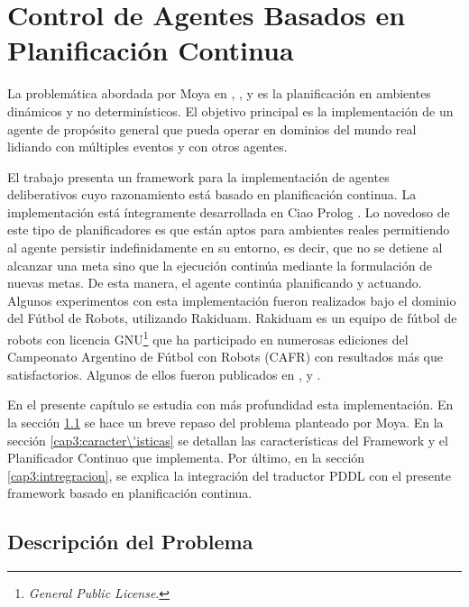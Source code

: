 
\chapter{Control de Agentes Basados en Planificaci\'on Continua} \label{pagcap3}

La problem\'atica abordada por Moya en \cite{gbraun:tesisMarioMoya}, \cite{moya08:_planif_contin_como_contr_de_agent_robot},
\cite{moya08:_un_planif_contin_concur_para_agent_robot} y \cite{moya09:_agent_delib_basad_en_contin}
es la planificaci\'on en ambientes din\'amicos y no determin\'isticos. 
El objetivo principal es la implementaci\'on de un agente de prop\'osito general
que pueda operar en dominios del mundo real lidiando con m\'ultiples
eventos y con otros agentes.

El trabajo presenta un framework para la implementaci\'on de 
agentes deliberativos cuyo ra\-zo\-na\-mien\-to est\'a basado en planificaci\'on
continua. La implementaci\'on est\'a \'integramente desarrollada en
Ciao Prolog \cite{ciao-reference-manual-tr}.
Lo novedoso de este tipo de planificadores es que est\'an aptos para ambientes
reales permitiendo al agente persistir indefinidamente
en su entorno, es decir, que no se detiene al alcanzar una meta
sino que la ejecuci\'on contin\'ua mediante la formulaci\'on de nuevas
metas. De esta manera, el agente contin\'ua planificando y actuando. 
Algunos experimentos con esta implementaci\'on fueron realizados bajo el
dominio del F\'utbol de Robots,
utilizando Rakiduam. Rakiduam es un equipo de f\'utbol de robots
con licencia GNU\footnote{\emph{General Public License}.} 
que ha participado en numerosas ediciones
del Campeonato Argentino de F\'utbol con Robots (CAFR) con resultados m\'as que
satisfactorios. Algunos de ellos fueron publicados en \cite{kogan07:_rakid},
\cite{kogan06:_aspec_de_y_de_del} y \cite{trevisani09:_rakid}.

En el presente cap\'itulo se estudia con m\'as profundidad
esta implementaci\'on. En la secci\'on \ref{cap3:desProblema}
se hace un breve repaso del problema planteado por Moya. 
En la secci\'on \ref{cap3:caracter\'isticas} se detallan
las caracter\'isticas del Framework y el Planificador
Continuo que implementa. Por \'ultimo, en la secci\'on
\ref{cap3:intregracion}, se explica
la integraci\'on del traductor PDDL con el presente
framework basado en planificaci\'on continua.



\section{Descripci\'on del Problema} \label{cap3:desProblema}


